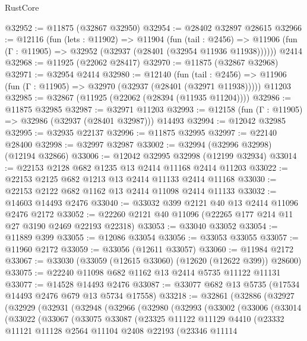 \begin{lexlean}{RustCore}
\begin{coremodule}
@32952 := @11875 (@32867 @32950)
@32954 := @28402 @32897 @28615
@32966 := @12116
    (fun (lets : @11902) =>
    @11904
      (fun (tail : @2456) =>
      @11906 (fun (Γ : @11905) => @32952 (@32937 (@28401 (@32954 @11936 @11938))))))
    @2414
@32968 := @11925 (@22062 @28417)
@32970 := @11875 (@32867 @32968)
@32971 := @32954 @2414
@32980 := @12140
    (fun (tail : @2456) => @11906 (fun (Γ : @11905) => @32970 (@32937 (@28401 (@32971 @11938)))))
    @11203
@32985 := @32867 (@11925 (@22062 (@28394 (@11935 @11204))))
@32986 := @11875 @32985
@32987 := @32971 @11203
@32993 := @12158 (fun (Γ : @11905) => @32986 (@32937 (@28401 @32987))) @14493
@32994 := @12042 @32985
@32995 := @32935 @22137
@32996 := @11875 @32995
@32997 := @22140 @28400
@32998 := @32997 @32987
@33002 := @32994 (@32996 @32998) (@12194 @32866)
@33006 := @12042 @32995 @32998 (@12199 @32934)
@33014 := @22153 @2128 @682 @1235 @13 @2414 @11168 @2414 @11203
@33022 := @22153 @2125 @682 @1213 @13 @2414 @11133 @2414 @11168
@33030 := @22153 @2122 @682 @1162 @13 @2414 @11098 @2414 @11133
@33032 := @14603 @14493 @2476
@33040 := @33032 @399 @2121 @40 @13 @2414 @11096 @2476 @2172
@33052 := @22260 @2121 @40 @11096 (@22265 @177 @214 @11 @27 @3190 @2469 @22193 @22318)
@33053 := @33040 @33052
@33054 := @11889 @399
@33055 := @12086 @33054
@33056 := @33053 @33055
@33057 := @11960 @2172
@33059 := @33056 (@12611 @33057)
@33060 := @11984 @2172
@33067 := @33030 (@33059 (@12615 @33060) (@12620 (@12622 @399)) @28600)
@33075 := @22240 @11098 @682 @1162 @13 @2414 @5735 @11122 @11131
@33077 := @14528 @14493 @2476
@33087 := @33077 @682 @13 @5735 (@17534 @14493 @2476 @679 @13 @5734 @17558)
@33218 := @32861
    (@32886
      (@32927
        (@32929
          (@32931
            (@32948
              (@32966
                (@32980
                  (@32993
                    (@33002
                      (@33006
                        (@33014
                          (@33022
                            (@33067
                              (@33075
                                @33087
                                (@23325
                                  @11122
                                  @11129
                                  @4410
                                  (@23332
                                    @11121
                                    @11128
                                    @2564
                                    @11104
                                    @2408
                                    @22193
                                    (@23346
                                      @11114

\end{coremodule}
\end{lexlean}
